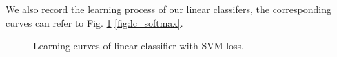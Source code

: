 \documentclass[10pt,twocolumn,letterpaper]{article}
\begin{document}
	We also record the learning process of our linear classifers, the corresponding curves can refer to Fig. \ref{fig:lc_svm} \ref{fig:lc_softmax}.
\begin{figure}[htbp]
	\centering
	\caption{Learning curves of linear classifier with SVM loss.}
	\label{fig:lc_svm}
\end{figure}
\end{document}
